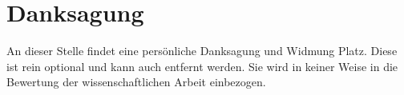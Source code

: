 \chapter*{Danksagung}

An dieser Stelle findet eine persönliche Danksagung und Widmung Platz. Diese ist rein optional und kann auch entfernt werden. Sie wird in keiner Weise in die Bewertung der wissenschaftlichen Arbeit einbezogen.
